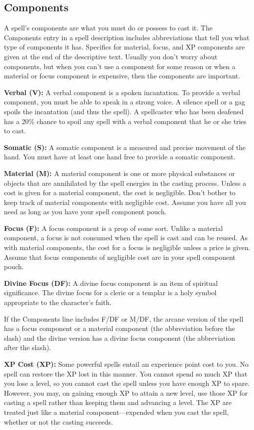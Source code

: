 \subsection{Components}
A spell's components are what you must do or possess to cast it. The Components entry in a spell description includes abbreviations that tell you what type of components it has. Specifics for material, focus, and XP components are given at the end of the descriptive text. Usually you don't worry about components, but when you can't use a component for some reason or when a material or focus component is expensive, then the components are important.

\textbf{Verbal (V):} A verbal component is a spoken incantation. To provide a verbal component, you must be able to speak in a strong voice. A silence spell or a gag spoils the incantation (and thus the spell). A spellcaster who has been deafened has a 20\% chance to spoil any spell with a verbal component that he or she tries to cast.

\textbf{Somatic (S):} A somatic component is a measured and precise movement of the hand. You must have at least one hand free to provide a somatic component.

\textbf{Material (M):} A material component is one or more physical substances or objects that are annihilated by the spell energies in the casting process. Unless a cost is given for a material component, the cost is negligible. Don't bother to keep track of material components with negligible cost. Assume you have all you need as long as you have your spell component pouch.

\textbf{Focus (F):} A focus component is a prop of some sort. Unlike a material component, a focus is not consumed when the spell is cast and can be reused. As with material components, the cost for a focus is negligible unless a price is given. Assume that focus components of negligible cost are in your spell component pouch.

\textbf{Divine Focus (DF):} A divine focus component is an item of spiritual significance. The divine focus for a cleric or a templar is a holy symbol appropriate to the character's faith.

If the Components line includes F/DF or M/DF, the arcane version of the spell has a focus component or a material component (the abbreviation before the slash) and the divine version has a divine focus component (the abbreviation after the slash).

\textbf{XP Cost (XP):} Some powerful spells entail an experience point cost to you. No spell can restore the XP lost in this manner. You cannot spend so much XP that you lose a level, so you cannot cast the spell unless you have enough XP to spare. However, you may, on gaining enough XP to attain a new level, use those XP for casting a spell rather than keeping them and advancing a level. The XP are treated just like a material component---expended when you cast the spell, whether or not the casting succeeds.